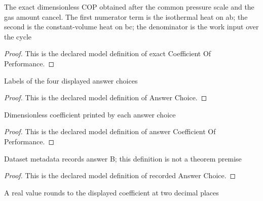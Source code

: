 \begin{definition}
  \label{def:physics:phyx-mini-0353:phyxminiproblems-problemphyxmini0353-exactcoefficientofperformance}
  The exact dimensionless COP obtained after the common pressure scale and the gas amount cancel. The first numerator term is the isothermal heat on ab; the second is the constant-volume heat on bc; the denominator is the work input over the cycle
\end{definition}
\begin{proof}
  This is the declared model definition of exact Coefficient Of Performance.
\end{proof}
\begin{definition}
  \label{def:physics:phyx-mini-0353:phyxminiproblems-problemphyxmini0353-answerchoice}
  Labels of the four displayed answer choices
\end{definition}
\begin{proof}
  This is the declared model definition of Answer Choice.
\end{proof}
\begin{definition}
  \label{def:physics:phyx-mini-0353:phyxminiproblems-problemphyxmini0353-answercoefficientofperformance}
  Dimensionless coefficient printed by each answer choice
\end{definition}
\begin{proof}
  This is the declared model definition of answer Coefficient Of Performance.
\end{proof}
\begin{definition}
  \label{def:physics:phyx-mini-0353:phyxminiproblems-problemphyxmini0353-recordedanswerchoice}
  Dataset metadata records answer B; this definition is not a theorem premise
\end{definition}
\begin{proof}
  This is the declared model definition of recorded Answer Choice.
\end{proof}
\begin{definition}
  \label{def:physics:phyx-mini-0353:phyxminiproblems-problemphyxmini0353-roundstodisplayedhundredth}
  A real value rounds to the displayed coefficient at two decimal places
\end{definition}
